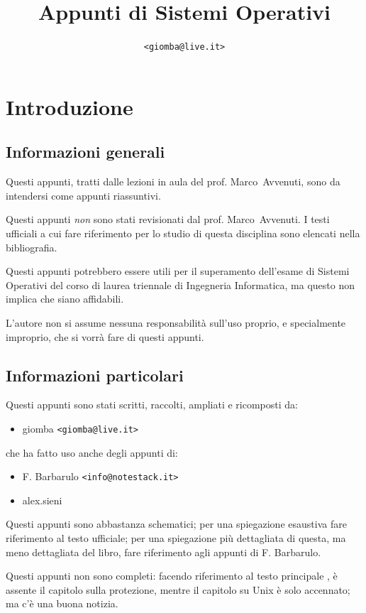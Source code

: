 \documentclass[12pt,a4paper]{article}
\title{Appunti di Sistemi Operativi}
\author{\texttt{<giomba@live.it>}}
\date{}
\begin{document}
\maketitle
\tableofcontents

\clearpage

\section{Introduzione}
\subsection{Informazioni generali}
Questi appunti, tratti dalle lezioni in aula del prof. Marco~Avvenuti,
sono da intendersi come appunti riassuntivi.

Questi appunti \textit{non} sono stati revisionati dal prof. Marco~Avvenuti.
I testi ufficiali a cui fare riferimento per lo studio di questa
disciplina sono elencati nella bibliografia.

Questi appunti potrebbero essere utili per il superamento dell'esame di
Sistemi Operativi del corso di laurea triennale di Ingegneria Informatica,
ma questo non implica che siano affidabili.

L'autore non si assume nessuna responsabilità sull'uso proprio,
e specialmente improprio, che si vorrà fare di questi appunti.

\subsection{Informazioni particolari}
Questi appunti sono stati scritti, raccolti, ampliati e ricomposti da:
\begin{itemize}
  \item giomba \texttt{<giomba@live.it>}
\end{itemize}
che ha fatto uso anche degli appunti di:
\begin{itemize}
  \item F. Barbarulo \small{\texttt{<info@notestack.it>}}
  \item alex.sieni
\end{itemize}

Questi appunti sono abbastanza schematici; per una spiegazione esaustiva
fare riferimento al testo ufficiale; per una spiegazione più dettagliata
di questa, ma meno dettagliata del libro, fare riferimento agli appunti
di F. Barbarulo.

Questi appunti non sono completi: facendo riferimento al testo principale
\cite{ancilotti:so}, è assente il capitolo sulla protezione, mentre il
capitolo su Unix è solo accennato; ma c'è una buona notizia.
\end{document}
